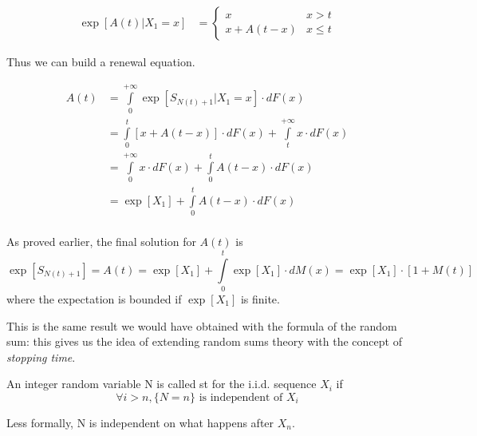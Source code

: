 \begin{equation}\begin{split}
	\exp[A(t)|X_1=x] &=
	\begin{cases}
		x & x>t \\
		x + A(t-x) & x \le t
	\end{cases}
\end{split} \end{equation}

Thus we can build a renewal equation.

\begin{equation} \begin{split}
	A(t) &= \int\limits_0^{+\infty} \exp[S_{N(t)+1}|X_1 = x] \cdot dF(x) \\
	&= \int\limits_0^{t} [x+ A(t-x)] \cdot dF(x) + \int\limits_t^{+\infty} x \cdot dF(x) \\
	&= \int\limits_0^{+\infty} x \cdot dF(x) + \int\limits_0^{t} A(t-x) \cdot dF(x) \\
	&= \exp[X_1] + \int\limits_0^{t} A(t-x) \cdot dF(x)\\
\end{split}\end{equation}

As proved earlier, the final solution for $A(t)$ is
$$ \exp[S_{N(t)+1}] = A(t) = \exp[X_1] + \int\limits_0^{t} \exp[X_1] \cdot dM(x) = \exp[X_1]\cdot [1+M(t)] $$
where the expectation is bounded if $\exp[X_1]$ is finite.

This is the same result we would have obtained with the formula of the random sum: this gives us the idea of extending random sums theory with the concept of \emph{stopping time}.

\begin{definition}
An integer random variable N is called \gls{st} for the i.i.d. sequence $X_i$ if
\begin{equation}
	\forall i > n, \{N=n\} \text{ is independent of }X_i
\end{equation}

Less formally, N is independent on what happens after $X_n$.
\end{definition}

